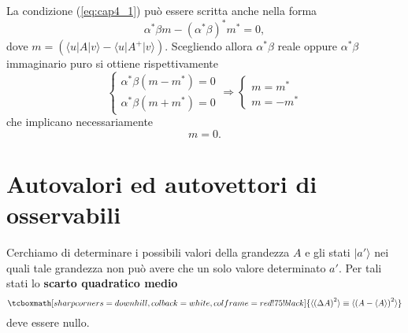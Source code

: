La condizione (\ref{eq:cap4_1}) può essere scritta anche nella forma
	\begin{equation}
		\alpha ^* \beta m - \left( \alpha ^*  \beta \right) ^* m^* =0, 
	\end{equation}
dove $m= \left( \langle u \vert A \vert v \rangle - \langle u \vert A^{+} \vert v \rangle \right)$. Scegliendo allora $\alpha ^* \beta$ reale oppure $\alpha ^* \beta$ immaginario puro si ottiene rispettivamente
	\begin{equation}
		\begin{cases}
		\alpha ^* \beta \left( m- m^* \right) =0 \\
		\alpha ^* \beta \left( m + m^* \right) =0
		\end{cases}
		\Rightarrow
		\begin{cases}
		m= m^*\\
		m= - m^*
		\end{cases}
	\end{equation}
che implicano necessariamente
	\begin{equation}
		m=0.
	\end{equation}
\section{Autovalori ed autovettori di osservabili}
Cerchiamo di determinare i possibili valori della grandezza $A$ e gli stati $\vert a' \rangle$ nei quali tale grandezza non può avere che un solo valore determinato $a'$. Per tali stati lo \textbf{scarto quadratico medio} 	
	\begin{equation}
		\tcboxmath[sharp corners=downhill ,colback=white,colframe=red!75!black]{
			\langle \left( \Delta A \right) ^2 \rangle \equiv \langle \left( A- \langle A\rangle \right) ^2 \rangle
			}
	\end{equation}
deve essere nullo.\\

